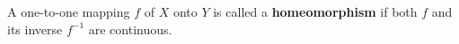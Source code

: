 A one-to-one mapping $f$ of $X$ onto $Y$ is called a \textbf{homeomorphism} if both $f$ and its inverse $f^{-1}$ are continuous.
